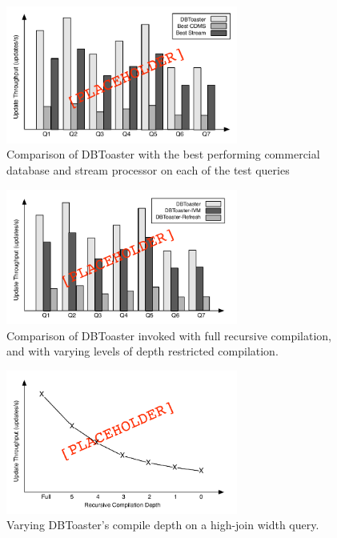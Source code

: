 \begin{figure}
\begin{center}
\includegraphics[width=3in]{../graphics-tmp/placeholder_bakeoff}
\end{center}
\label{fig:exp:bakeoff}
\caption{Comparison of DBToaster with the best performing commercial database and stream processor on each of the test queries}
\end{figure}

\begin{figure}
\begin{center}
\includegraphics[width=3in]{../graphics-tmp/placeholder_throughput_all}
\end{center}
\label{fig:exp:bakeoff}
\caption{Comparison of DBToaster invoked with full recursive compilation, and with varying levels of depth restricted compilation.}
\end{figure}

\begin{figure}
\begin{center}
\includegraphics[width=3in]{../graphics-tmp/placeholder_throughput_ssb4}
\end{center}
\label{fig:exp:bakeoff}
\caption{Varying DBToaster's compile depth on a high-join width query.}
\end{figure}

